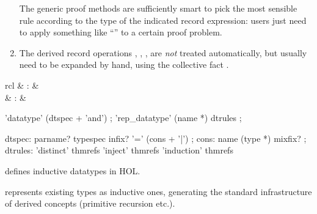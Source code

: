 \begin{isabellebody}
\begin{isamarkuptext}
\begin{enumerate}
  The generic proof methods are sufficiently smart to pick the most
  sensible rule according to the type of the indicated record
  expression: users just need to apply something like ``'' to a certain proof problem.

  \item The derived record operations , , ,  are \emph{not}
  treated automatically, but usually need to be expanded by hand,
  using the collective fact .

  \end{enumerate}%
\end{isamarkuptext}%
\isamarkuptrue%
%
\isamarkuptrue%
%
\begin{isamarkuptext}%
\begin{matharray}{rcl}
    \hypertarget{command.HOL.datatype}{\hyperlink{command.HOL.datatype}{\mbox{}}} & : &  \\
    \hypertarget{command.HOL.rep-datatype}{\hyperlink{command.HOL.rep-datatype}{\mbox{}}} & : &  \\
  \end{matharray}

  \begin{rail}
    'datatype' (dtspec + 'and')
    ;
    'rep\_datatype' (name *) dtrules
    ;

    dtspec: parname? typespec infix? '=' (cons + '|')
    ;
    cons: name (type *) mixfix?
    ;
    dtrules: 'distinct' thmrefs 'inject' thmrefs 'induction' thmrefs
  \end{rail}

  \begin{descr}

  \item [\hyperlink{command.HOL.datatype}{\mbox{\isa{\isacommand{datatype}}}}] defines inductive datatypes in
  HOL.

  \item [\hyperlink{command.HOL.rep-datatype}{\mbox{\isa{\isacommand{rep{\isacharunderscore}datatype}}}}] represents existing types as
  inductive ones, generating the standard infrastructure of derived
  concepts (primitive recursion etc.).


\end{descr}
\end{isamarkuptext}
\end{isabellebody}

